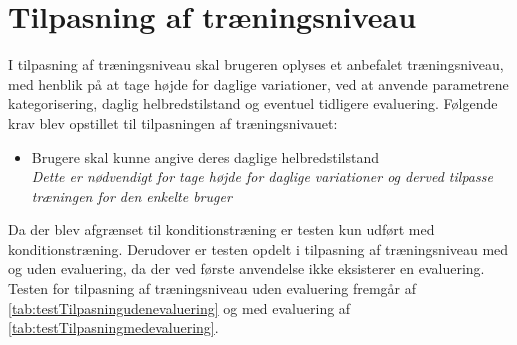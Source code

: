 \section{Tilpasning af træningsniveau}
I tilpasning af træningsniveau skal brugeren oplyses et anbefalet træningsniveau, med henblik på at tage højde for daglige variationer, ved at anvende parametrene kategorisering, daglig helbredstilstand og eventuel tidligere evaluering. Følgende krav blev opstillet til tilpasningen af træningsnivauet:

\begin{itemize}
\item Brugere skal kunne angive deres daglige helbredstilstand
\\
\textit{Dette er nødvendigt for tage højde for daglige variationer og derved tilpasse træningen for den enkelte bruger}
\end{itemize}

\noindent
Da der blev afgrænset til konditionstræning er testen kun udført med konditionstræning. Derudover er testen opdelt i tilpasning af træningsniveau med og uden evaluering, da der ved første anvendelse ikke eksisterer en evaluering. Testen for tilpasning af træningsniveau uden evaluering fremgår af \autoref{tab:testTilpasningudenevaluering} og med evaluering af \autoref{tab:testTilpasningmedevaluering}.

